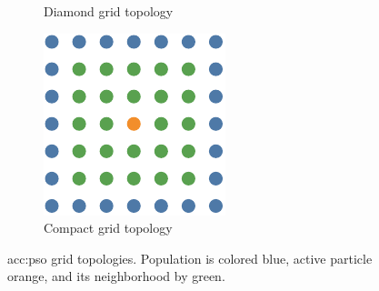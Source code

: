 \begin{figure}[t]
\begin{subfigure}[t]{0.3\textwidth}
        \caption{Diamond grid topology}
        \label{fig:topologygriddiamond}
    \end{subfigure}
    \hfill
    \begin{subfigure}[t]{0.3\textwidth}
        \includegraphics[width=\textwidth]{img/master_neigh_compact.pdf}
        \caption{Compact grid topology}
        \label{fig:topologygridcompact}
    \end{subfigure}
    \caption[\acrshort*{acc:pso} grid topologies]{\acrshort*{acc:pso} grid topologies. Population is colored blue, active particle orange, and its neighborhood by green.}
\end{figure}

